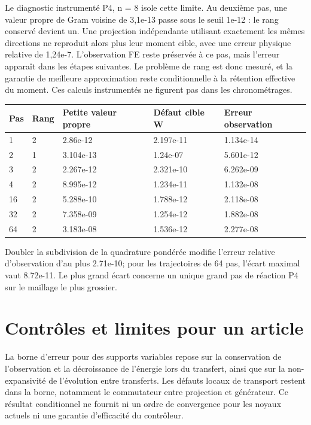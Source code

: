 \documentclass[10pt,a4paper]{article}
\begin{document}
Le diagnostic instrumenté P4, n = 8 isole cette limite. Au deuxième pas, une valeur propre de Gram voisine de 3,1e-13 passe sous le seuil 1e-12 : le rang conservé devient un. Une projection indépendante utilisant exactement les mêmes directions ne reproduit alors plus leur moment cible, avec une erreur physique relative de 1,24e-7. L’observation FE reste préservée à ce pas, mais l’erreur apparaît dans les étapes suivantes. Le problème de rang est donc mesuré, et la garantie de meilleure approximation reste conditionnelle à la rétention effective du moment. Ces calculs instrumentés ne figurent pas dans les chronométrages.

\begin{center}\small\begin{tabular}{lllll}\toprule
Pas & Rang & Petite valeur propre & Défaut cible W & Erreur observation\\\midrule
1 & 2 & 2.86e-12 & 2.197e-11 & 1.134e-14\\
2 & 1 & 3.104e-13 & 1.24e-07 & 5.601e-12\\
3 & 2 & 2.267e-12 & 2.321e-10 & 6.262e-09\\
4 & 2 & 8.995e-12 & 1.234e-11 & 1.132e-08\\
16 & 2 & 5.288e-10 & 1.788e-12 & 2.118e-08\\
32 & 2 & 7.358e-09 & 1.254e-12 & 1.882e-08\\
64 & 2 & 3.183e-08 & 1.536e-12 & 2.277e-08\\
\bottomrule\end{tabular}\end{center}
Doubler la subdivision de la quadrature pondérée modifie l’erreur relative d’observation d’au plus 2.71e-10; pour les trajectoires de 64 pas, l’écart maximal vaut 8.72e-11. Le plus grand écart concerne un unique grand pas de réaction P4 sur le maillage le plus grossier.

\section{Contrôles et limites pour un article}
La borne d'erreur pour des supports variables repose sur la conservation de l'observation et la décroissance de l'énergie lors du transfert, ainsi que sur la non-expansivité de l'évolution entre transferts. Les défauts locaux de transport restent dans la borne, notamment le commutateur entre projection et générateur. Ce résultat conditionnel ne fournit ni un ordre de convergence pour les noyaux actuels ni une garantie d'efficacité du contrôleur.
\end{document}
